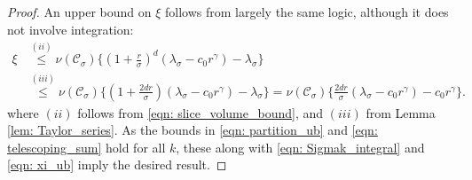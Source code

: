 \documentclass{article}
\newcommand{\1}{\mathbf{1}}
\newcommand{\Cset}{\mathcal{C}}
\newcommand{\Csig}{\Cset_{\sigma}}
\theoremstyle{aldenthm}
\theoremstyle{aldenrmrk}
\begin{document}
\begin{proof}
	An upper bound on $\xi$ follows from largely the same logic, although it does not involve integration:
	\begin{align}
	\xi & \overset{(ii)}{\leq} \nu(\Csig) \biggl\{ \left(1 + \frac{ r}{\sigma}\right)^d(\lambda_{\sigma} - c_0r^{\gamma}) - \lambda_{\sigma} \biggr\} \nonumber \\
	& \overset{(iii)}{\leq} \nu(\Csig) \biggl\{ \left(1 + \frac{2d r}{\sigma}\right)(\lambda_{\sigma} - c_0r^{\gamma}) - \lambda_{\sigma} \biggr\} = \nu(\Csig) \biggl\{ \frac{2dr}{\sigma}(\lambda_{\sigma} - c_0r^{\gamma}) - c_0 r^{\gamma} \biggr\}. \label{eqn: xi_ub}
	\end{align}
	where $(ii)$ follows from \eqref{eqn: slice_volume_bound}, and $(iii)$ from Lemma \ref{lem: Taylor_series}. As the bounds in \eqref{eqn: partition_ub} and \eqref{eqn: telescoping_sum} hold for all $k$, these along with \eqref{eqn: Sigmak_integral} and \eqref{eqn: xi_ub} imply the desired result.
\end{proof}
\end{document}
